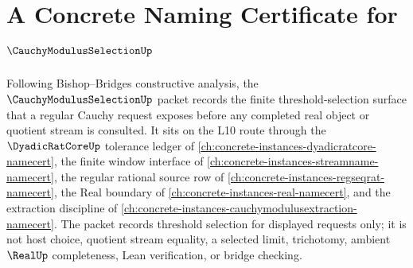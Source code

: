 \chapter{A Concrete Naming Certificate for $\CauchyModulusSelectionUp$}
\label{ch:concrete-instances-cauchy-modulus-selection-namecert}

Following Bishop--Bridges constructive analysis, the $\CauchyModulusSelectionUp$ packet records the finite threshold-selection surface that a regular Cauchy request exposes before any completed real object or quotient stream is consulted. It sits on the L10 route through the $\DyadicRatCoreUp$ tolerance ledger of \autoref{ch:concrete-instances-dyadicratcore-namecert}, the finite window interface of \autoref{ch:concrete-instances-streamname-namecert}, the regular rational source row of \autoref{ch:concrete-instances-regseqrat-namecert}, the Real boundary of \autoref{ch:concrete-instances-real-namecert}, and the extraction discipline of \autoref{ch:concrete-instances-cauchymodulusextraction-namecert}. The packet records threshold selection for displayed requests only; it is not host choice, quotient stream equality, a selected limit, trichotomy, ambient $\RealUp$ completeness, Lean verification, or bridge checking.

